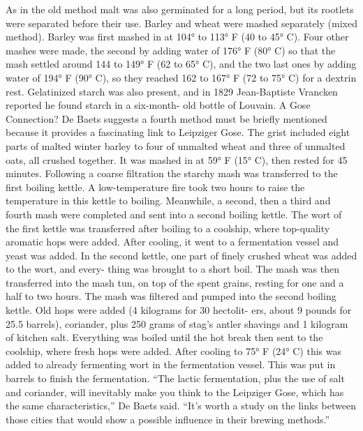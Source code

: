 \documentclass[a4paper,parskip=half]{scrartcl}
\begin{document}
As in the old method malt was also germinated for a long period,
but its rootlets were separated before their use.
Barley and wheat were mashed separately (mixed method). Barley
was first mashed in at 104° to 113° F (40 to 45° C). Four other mashes
were made, the second by adding water of 176° F (80° C) so that the
mash settled around 144 to 149° F (62 to 65° C), and the two last ones
by adding water of 194° F (90° C), so they reached 162 to 167° F (72
to 75° C) for a dextrin rest. Gelatinized starch was also present, and in
1829 Jean-Baptiste Vrancken reported he found starch in a six-month-
old bottle of Louvain.
A Gose Connection?
De Baets suggests a fourth method must be briefly mentioned because it provides a
fascinating link to Leipziger Gose. The grist included eight parts of malted winter barley to
four of unmalted wheat and three of unmalted oats, all crushed together. It was mashed
in at 59° F (15° C), then rested for 45 minutes. Following a coarse filtration the starchy
mash was transferred to the first boiling kettle. A low-temperature fire took two hours to
raise the temperature in this kettle to boiling. Meanwhile, a second, then a third and fourth
mash were completed and sent into a second boiling kettle.
The wort of the first kettle was transferred after boiling to a coolship, where top-quality
aromatic hops were added. After cooling, it went to a fermentation vessel and yeast was
added.
In the second kettle, one part of finely crushed wheat was added to the wort, and every-
thing was brought to a short boil. The mash was then transferred into the mash tun, on
top of the spent grains, resting for one and a half to two hours. The mash was filtered and
pumped into the second boiling kettle. Old hops were added (4 kilograms for 30 hectolit-
ers, about 9 pounds for 25.5 barrels), coriander, plus 250 grams of stag’s antler shavings
and 1 kilogram of kitchen salt. Everything was boiled until the hot break then sent to the
coolship, where fresh hops were added. After cooling to 75° F (24° C) this was added to
already fermenting wort in the fermentation vessel. This was put in barrels to finish the
fermentation.
“The lactic fermentation, plus the use of salt and coriander, will inevitably make you think
to the Leipziger Gose, which has the same characteristics,” De Baets said. “It’s worth
a study on the links between those cities that would show a possible influence in their
brewing methods.”

\parencite[43]{Hieronymus2010}
\end{document}
